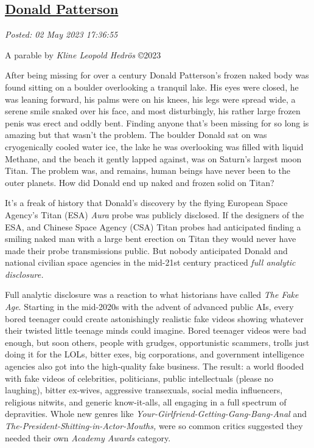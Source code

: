 %

\subsection*{\href{http://analyzethedatanotthedrivel.org/2023/05/02/donald-patterson/}{Donald Patterson}}


\noindent\emph{Posted: 02 May 2023 17:36:55}
\vspace{6pt}

A parable by \emph{Kline Leopold Hedrös} ©2023

After being missing for over a century Donald Patterson's frozen naked
body was found sitting on a boulder overlooking a tranquil lake. His
eyes were closed, he was leaning forward, his palms were on his knees,
his legs were spread wide, a serene smile snaked over his face, and most
disturbingly, his rather large frozen penis was erect and oddly bent.
Finding anyone that's been missing for so long is amazing but that
wasn't the problem. The boulder Donald sat on was cryogenically cooled
water ice, the lake he was overlooking was filled with liquid Methane,
and the beach it gently lapped against, was on Saturn's largest moon
Titan. The problem was, and remains, human beings have never been to the
outer planets. How did Donald end up naked and frozen solid on Titan?

It's a freak of history that Donald's discovery by the flying European
Space Agency's Titan (ESA) \emph{Aura} probe was publicly disclosed. If
the designers of the ESA, and Chinese Space Agency (CSA) Titan probes
had anticipated finding a smiling naked man with a large bent erection
on Titan they would never have made their probe transmissions public.
But nobody anticipated Donald and national civilian space agencies in
the mid-21st century practiced \emph{full analytic disclosure.}

Full analytic disclosure was a reaction to what historians have called
\emph{The Fake Age}. Starting in the mid-2020s with the advent of
advanced public AIs, every bored teenager could create astonishingly
realistic fake videos showing whatever their twisted little teenage
minds could imagine. Bored teenager videos were bad enough, but soon
others, people with grudges, opportunistic scammers, trolls just doing
it for the LOLs, bitter exes, big corporations, and government
intelligence agencies also got into the high-quality fake business. The
result: a world flooded with fake videos of celebrities, politicians,
public intellectuals (please no laughing), bitter ex-wives, aggressive
transexuals, social media influencers, religious nitwits, and generic
know-it-alls, all engaging in a full spectrum of depravities. Whole new
genres like \emph{Your-Girlfriend-Getting-Gang-Bang-Anal} and
\emph{The-President-Shitting-in-Actor-Mouths,} were so common critics
suggested they needed their own \emph{Academy Awards} category.

